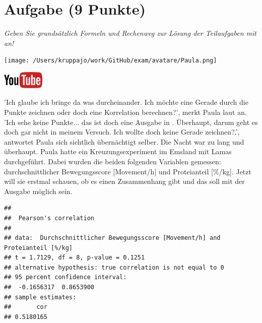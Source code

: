 \documentclass[a4paper, 9pt]{scrartcl}\usepackage[]{graphicx}\usepackage[]{xcolor}
\makeatletter
\newenvironment{kframe}{%
 \def\at@end@of@kframe{}%
 \ifinner\ifhmode%
  \def\at@end@of@kframe{\end{minipage}}%
  \begin{minipage}{\columnwidth}%
 \fi\fi%
 \def\FrameCommand##1{\hskip\@totalleftmargin \hskip-\fboxsep
 \colorbox{shadecolor}{##1}\hskip-\fboxsep
     \hskip-\linewidth \hskip-\@totalleftmargin \hskip\columnwidth}%
 \MakeFramed {\advance\hsize-\width
   \@totalleftmargin\z@ \linewidth\hsize
   \@setminipage}}%
 {\par\unskip\endMakeFramed%
 \at@end@of@kframe}
\newenvironment{knitrout}{}{} %
\makeatother
\begin{document}
\clearpage

\section{Aufgabe \hfill (9 Punkte)}

\textit{Geben Sie grundsätzlich Formeln und Rechenweg zur Lösung der Teilaufgaben mit an!} \\[1Ex]
 

 
\begin{minipage}[t]{0.5\textwidth}
\texttt{[image: /Users/kruppajo/work/GitHub/exam/avatare/Paula.png]}
\end{minipage}
\begin{minipage}[t]{0.5\textwidth}
\hfill
\href{https://youtu.be/C9skfFRTHhI}{\includegraphics[width = 2cm]{img/youtube}}
\end{minipage}
\vspace{1ex}



'Ich glaube ich bringe da was durcheinander. Ich möchte eine Gerade durch die Punkte zeichnen oder doch eine Korrelation berechnen?', merkt Paula laut an. 'Ich sehe keine Punkte... das ist doch eine Ausgabe in \Rlogo. Überhaupt, darum geht es doch gar nicht in meinem Versuch. Ich wollte doch keine Gerade zeichnen?.', antwortet Paula sich sichtlich übernächtigt selber. Die Nacht war zu lang und überhaupt. Paula hatte ein Kreuzungsexperiment im Emsland mit Lamas durchgeführt. Dabei wurden die beiden folgenden Variablen gemessen: durchschnittlicher Bewegungsscore [Movement/h] und Proteianteil [\%/kg]. Jetzt will sie erstmal schauen, ob es einen Zusammenhang gibt und das soll mit der \Rlogo Ausgabe möglich sein.


\begin{knitrout}
\color{fgcolor}\begin{kframe}
\begin{verbatim}
## 
## 	Pearson's correlation
## 
## data:  Durchschnittlicher Bewegungsscore [Movement/h] and Proteianteil [%/kg]
## t = 1.7129, df = 8, p-value = 0.1251
## alternative hypothesis: true correlation is not equal to 0
## 95 percent confidence interval:
##  -0.1656317  0.8653900
## sample estimates:
##       cor 
## 0.5180165
\end{verbatim}
\end{kframe}
\end{knitrout}
\end{document}
